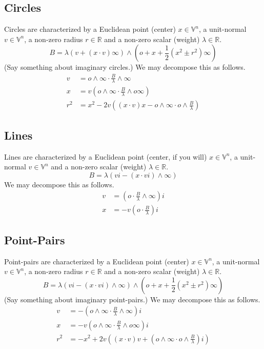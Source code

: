 \documentclass[12pt]{article}
\newcommand{\V}{\mathbb{V}}
\newcommand{\R}{\mathbb{R}}
\newcommand{\nvao}{o}
\newcommand{\nvai}{\infty}
\begin{document}
\subsection{Circles}

Circles are characterized by a Euclidean point (center) $x\in\V^n$,
a unit-normal $v\in\V^n$, a non-zero radius $r\in\R$ and a non-zero scalar (weight) $\lambda\in\R$.
\begin{equation*}
B = \lambda(v+(x\cdot v)\nvai)\wedge\left(\nvao+x+\frac{1}{2}(x^2\pm r^2)\nvai\right)
\end{equation*}
(Say something about imaginary circles.)  We may decompose this as follows.
\begin{align*}
v &= \nvao\wedge\nvai\cdot\frac{B}{\lambda}\wedge\nvai \\
x &= v\left(\nvao\wedge\nvai\cdot\frac{B}{\lambda}\wedge\nvao\nvai\right) \\
r^2 &= x^2 - 2v\left((x\cdot v)x-\nvao\wedge\nvai\cdot\nvao\wedge \frac{B}{\lambda}\right)
\end{align*}

\subsection{Lines}

Lines are characterized by a Euclidean point (center, if you will) $x\in\V^n$,
a unit-normal $v\in\V^n$ and a non-zero scalar (weight) $\lambda\in\R$.
\begin{equation*}
B = \lambda\left(vi - \left(x\cdot vi\right)\wedge\nvai\right)
\end{equation*}
We may decompose this as follows.
\begin{align*}
v &= \left(\nvao\cdot\frac{B}{\lambda}\wedge\nvai\right)i \\
x &= -v\left(\nvao\cdot\frac{B}{\lambda}\right)i
\end{align*}

\subsection{Point-Pairs}

Point-pairs are characterized by a Euclidean point (center) $x\in\V^n$,
a unit-normal $v\in\V^n$, a non-zero radius $r\in\R$ and a non-zero scalar (weight) $\lambda\in\R$.
\begin{equation*}
B = \lambda(vi-(x\cdot vi)\wedge\nvai)\wedge\left(\nvao+x+\frac{1}{2}(x^2\pm r^2)\nvai\right)
\end{equation*}
(Say something about imaginary point-pairs.)  We may decompose this as follows.
\begin{align*}
v &= -\left(\nvao\wedge\nvai\cdot\frac{B}{\lambda}\wedge\nvai\right)i \\
x &= -v\left(\nvao\wedge\nvai\cdot\frac{B}{\lambda}\wedge\nvao\nvai\right)i \\
r^2 &= -x^2+2v\left((x\cdot v)v+\left(\nvao\wedge\nvai\cdot\nvao\wedge\frac{B}{\lambda}\right)i\right)
\end{align*}
\end{document}
